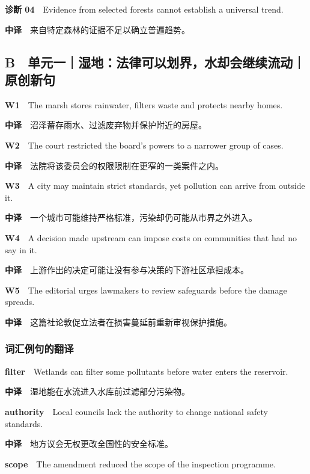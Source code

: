 \documentclass[
  11pt,
]{ctexart}
\begin{document}
\textbf{诊断 04}　Evidence from selected forests cannot establish a
universal trend.

\textbf{中译}　来自特定森林的证据不足以确立普遍趋势。

\subsection{B　单元一｜湿地：法律可以划界，水却会继续流动｜原创新句}\label{b-ux5355ux5143ux4e00ux6e7fux5730ux6cd5ux5f8bux53efux4ee5ux5212ux754cux6c34ux5374ux4f1aux7ee7ux7eedux6d41ux52a8ux539fux521bux65b0ux53e5}

\textbf{W1}　The marsh stores rainwater, filters waste and protects
nearby homes.

\textbf{中译}　沼泽蓄存雨水、过滤废弃物并保护附近的房屋。

\textbf{W2}　The court restricted the board's powers to a narrower group
of cases.

\textbf{中译}　法院将该委员会的权限限制在更窄的一类案件之内。

\textbf{W3}　A city may maintain strict standards, yet pollution can
arrive from outside it.

\textbf{中译}　一个城市可能维持严格标准，污染却仍可能从市界之外进入。

\textbf{W4}　A decision made upstream can impose costs on communities
that had no say in it.

\textbf{中译}　上游作出的决定可能让没有参与决策的下游社区承担成本。

\textbf{W5}　The editorial urges lawmakers to review safeguards before
the damage spreads.

\textbf{中译}　这篇社论敦促立法者在损害蔓延前重新审视保护措施。

\subsubsection{词汇例句的翻译}\label{ux8bcdux6c47ux4f8bux53e5ux7684ux7ffbux8bd1}

\textbf{filter}　Wetlands can filter some pollutants before water enters
the reservoir.

\textbf{中译}　湿地能在水流进入水库前过滤部分污染物。

\textbf{authority}　Local councils lack the authority to change national
safety standards.

\textbf{中译}　地方议会无权更改全国性的安全标准。

\textbf{scope}　The amendment reduced the scope of the inspection
programme.
\end{document}
